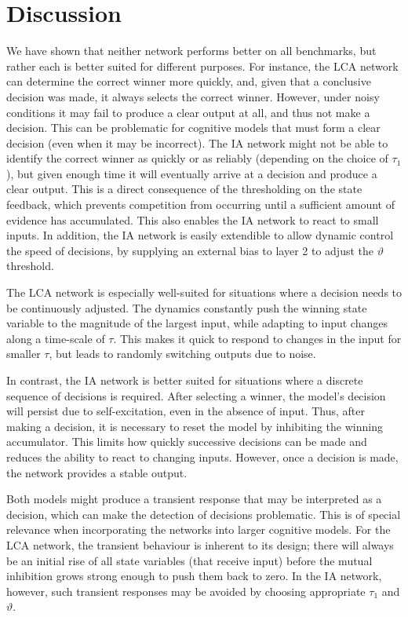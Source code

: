 \documentclass[10pt,letterpaper]{article}
\begin{document}
\section{Discussion}
We have shown that neither network performs better on all benchmarks, but rather each is better suited for different purposes.
For instance, the LCA network can determine the correct winner more quickly, and, given that a conclusive decision was made, it always selects the correct winner.
However, under noisy conditions it may fail to produce a clear output at all, and thus not make a decision.
This can be problematic for cognitive models that must form a clear decision (even when it may be incorrect).
The IA network might not be able to identify the correct winner as quickly or as reliably (depending on the choice of $\tau_1$), but given enough time it will eventually arrive at a decision and produce a clear output.
This is a direct consequence of the thresholding on the state feedback, which prevents competition from occurring until a sufficient amount of evidence has accumulated.
This also enables the IA network to react to small inputs.
In addition, the IA network is easily extendible to allow dynamic control the speed of decisions, by supplying an external bias to layer 2 to adjust the $\vartheta$ threshold.

The LCA network is especially well-suited for situations where a decision needs to be continuously adjusted.
The dynamics constantly push the winning state variable to the magnitude of the largest input, while adapting to input changes along a time-scale of $\tau$.
This makes it quick to respond to changes in the input for smaller $\tau$, but leads to randomly switching outputs due to noise.

In contrast, the IA network is better suited for situations where a discrete sequence of decisions is required.
After selecting a winner, the model's decision will persist due to self-excitation, even in the absence of input.
Thus, after making a decision, it is necessary to reset the model by inhibiting the winning accumulator.
This limits how quickly successive decisions can be made and reduces the ability to react to changing inputs.
However, once a decision is made, the network provides a stable output.

Both models might produce a transient response that may be interpreted as a decision, which can make the detection of decisions problematic.
This is of special relevance when incorporating the networks into larger cognitive models.
For the LCA network, the transient behaviour is inherent to its design; there will always be an initial rise of all state variables (that receive input) before the mutual inhibition grows strong enough to push them back to zero.
In the IA network, however, such transient responses may be avoided by choosing appropriate $\tau_1$ and $\vartheta$.
\end{document}
